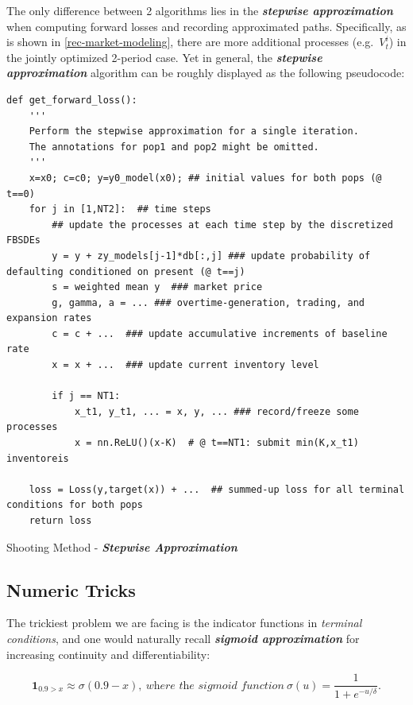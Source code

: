 \documentclass[a4paper,10pt]{article}
\newcommand{\1}{\mathbf{1}}
\begin{document}
The only difference between 2 algorithms lies in the \textbf{\textit{stepwise approximation}} when computing forward losses and recording approximated
paths. Specifically, as is shown in \ref{rec-market-modeling}, there are more additional processes (e.g.~\(V_t^i\)) in the jointly optimized 2-period case. Yet in general, the \textbf{\textit{stepwise approximation}} algorithm can be roughly displayed as the following pseudocode:

\begin{algorithm}[ht]
\begin{verbatim}
def get_forward_loss():
    '''
    Perform the stepwise approximation for a single iteration. 
    The annotations for pop1 and pop2 might be omitted.
    '''
    x=x0; c=c0; y=y0_model(x0); ## initial values for both pops (@ t==0)
    for j in [1,NT2]:  ## time steps
        ## update the processes at each time step by the discretized FBSDEs
        y = y + zy_models[j-1]*db[:,j] ### update probability of defaulting conditioned on present (@ t==j)
        s = weighted mean y  ### market price
        g, gamma, a = ... ### overtime-generation, trading, and expansion rates 
        c = c + ...  ### update accumulative increments of baseline rate
        x = x + ...  ### update current inventory level

        if j == NT1:
            x_t1, y_t1, ... = x, y, ... ### record/freeze some processes 
            x = nn.ReLU()(x-K)  # @ t==NT1: submit min(K,x_t1) inventoreis

    loss = Loss(y,target(x)) + ...  ## summed-up loss for all terminal conditions for both pops
    return loss 
\end{verbatim}
\caption{Shooting Method - \textbf{\textit{Stepwise Approximation}}} 
\label{alg:stepwise-approx}
\end{algorithm}

\subsection{Numeric Tricks}\label{numeric-tricks}

The trickiest problem we are facing is the indicator functions in
\emph{terminal conditions}, and one would naturally recall
\textbf\textit{sigmoid approximation} for increasing continuity and
differentiability:

\begin{equation}
    \1_{0.9>x} \approx \sigma(0.9-x), ~\textit{where the sigmoid function}~\sigma(u)=\frac{1}{1+e^{-u/\delta}}.
\end{equation}
\end{document}
